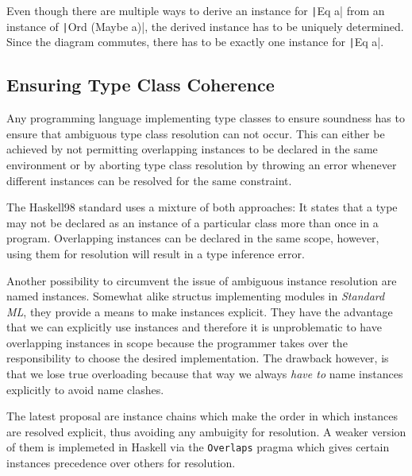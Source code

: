 Even though there are multiple ways to derive an instance for \texttt|Eq a| from an instance of \texttt|Ord (Maybe a)|, the derived instance has to be uniquely determined.
Since the diagram commutes, there has to be exactly one instance for \texttt|Eq a|.

\subsection{Ensuring Type Class Coherence}

Any programming language implementing type classes to ensure soundness has to ensure that ambiguous type class resolution can not occur.
This can either be achieved by not permitting overlapping instances to be declared in the same environment or by aborting type class resolution by throwing an error whenever different instances can be resolved for the same constraint.

The Haskell98 standard \cite{Haskell98} uses a mixture of both approaches:
It states that a type may not be declared as an instance of a particular class more than once in a program.
Overlapping instances can be declared in the same scope, however, using them for resolution will result in a type inference error.

Another possibility to circumvent the issue of ambiguous instance resolution are named instances.
Somewhat alike structus implementing modules in \emph{Standard ML}, they provide a means to make instances explicit.
They have the advantage that we can explicitly use instances and therefore it is unproblematic to have overlapping instances in scope because the programmer takes over the responsibility to choose the desired implementation.
The drawback however, is that we lose true overloading because that way we always \emph{have to} name instances explicitly to avoid name clashes.

The latest proposal are instance chains which make the order in which instances are resolved explicit, thus avoiding any ambuigity for resolution. \cite{morris2010instance}
A weaker version of them is implemeted in Haskell via the \texttt{Overlaps} pragma which gives certain instances precedence over others for resolution.
